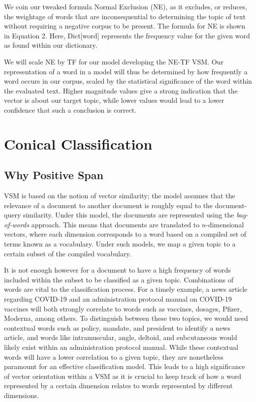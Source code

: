 \documentclass[11pt]{article}
\begin{document}
We coin our tweaked formula Normal Exclusion (NE), as it excludes, or reduces, the weightage of words that are inconsequential to determining the topic of text without requiring a negative corpus to be present. The formula for NE is shown in Equation 2. Here, Dict[word] represents the frequency value for the given word as found within our dictionary.

We will scale NE by TF for our model developing the NE-TF VSM. Our representation of a word in a model will thus be determined by how frequently a word occurs in our corpus, scaled by the statistical significance of the word within the evaluated text. Higher magnitude values give a strong indication that the vector is about our target topic, while lower values would lead to a lower confidence that such a conclusion is correct.

\section{Conical Classification}
\subsection{Why Positive Span}
VSM is based on the notion of vector similarity; the model assumes that the relevance of a document to another document is roughly equal to the document-query similarity. Under this model, the documents are represented using the \textit{bag-of-words} approach. This means that documents are translated to $n$-dimensional vectors, where each dimension corresponds to a word based on a compiled set of terms known as a vocabulary. Under such models, we map a given topic to a certain subset of the compiled vocabulary.

It is not enough however for a document to have a high frequency of words included within the subset to be classified as a given topic. Combinations of words are vital to the classification process. For a timely example, a news article regarding COVID-19 and an administration protocol manual on COVID-19 vaccines will both strongly correlate to words such as vaccines, dosages, Pfizer, Moderna, among others. To distinguish between these two topics, we would need contextual words such as policy, mandate, and president to identify a news article, and words like intramuscular, angle, deltoid, and subcutaneous would likely exist within an administration protocol manual. While these contextual words will have a lower correlation to a given topic, they are nonetheless paramount for an effective classification model. This leads to a high significance of vector orientation within a VSM as it is crucial to keep track of how a word represented by a certain dimension relates to words represented by different dimensions.
\end{document}
